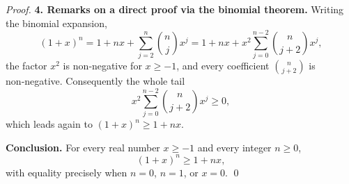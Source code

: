 \begin{proof}
\medskip
\textbf{4. Remarks on a direct proof via the binomial theorem.}
Writing the binomial expansion,
\[
(1+x)^{n}=1+nx+\sum_{j=2}^{n}\binom{n}{j}x^{j}
        =1+nx+x^{2}\sum_{j=0}^{n-2}\binom{n}{j+2}x^{j},
\]
the factor $x^{2}$ is non‑negative for $x\ge-1$, and every coefficient $\binom{n}{j+2}$ is non‑negative. Consequently the whole tail
\[
x^{2}\sum_{j=0}^{n-2}\binom{n}{j+2}x^{j}\ge0,
\]
which leads again to $(1+x)^{n}\ge 1+nx$.

\medskip
\textbf{Conclusion.}
For every real number $x\ge-1$ and every integer $n\ge0$,
\[
(1+x)^{n}\ge 1+n x ,
\]
with equality precisely when $n=0$, $n=1$, or $x=0$. \qed
\end{proof}